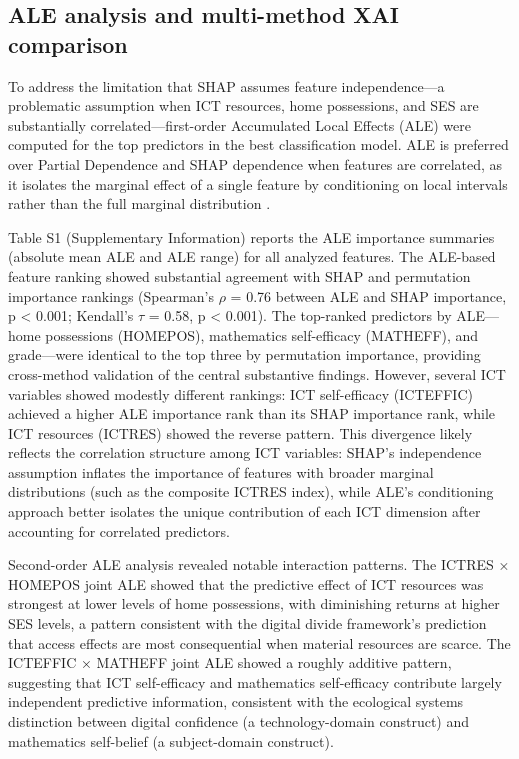 \documentclass[pdflatex,sn-mathphys-ay]{sn-jnl}
\begin{document}
\subsection{ALE analysis and multi-method XAI comparison}

To address the limitation that SHAP assumes feature independence---a problematic assumption when ICT resources, home possessions, and SES are substantially correlated---first-order Accumulated Local Effects (ALE) were computed for the top predictors in the best classification model. ALE is preferred over Partial Dependence and SHAP dependence when features are correlated, as it isolates the marginal effect of a single feature by conditioning on local intervals rather than the full marginal distribution \citep{Molnar_2022,Herbinger_2024_GADGET}.

Table S1 (Supplementary Information) reports the ALE importance summaries (absolute mean ALE and ALE range) for all analyzed features. The ALE-based feature ranking showed substantial agreement with SHAP and permutation importance rankings (Spearman's $\rho$ = 0.76 between ALE and SHAP importance, p < 0.001; Kendall's $\tau$ = 0.58, p < 0.001). The top-ranked predictors by ALE---home possessions (HOMEPOS), mathematics self-efficacy (MATHEFF), and grade---were identical to the top three by permutation importance, providing cross-method validation of the central substantive findings. However, several ICT variables showed modestly different rankings: ICT self-efficacy (ICTEFFIC) achieved a higher ALE importance rank than its SHAP importance rank, while ICT resources (ICTRES) showed the reverse pattern. This divergence likely reflects the correlation structure among ICT variables: SHAP's independence assumption inflates the importance of features with broader marginal distributions (such as the composite ICTRES index), while ALE's conditioning approach better isolates the unique contribution of each ICT dimension after accounting for correlated predictors.

Second-order ALE analysis revealed notable interaction patterns. The ICTRES × HOMEPOS joint ALE showed that the predictive effect of ICT resources was strongest at lower levels of home possessions, with diminishing returns at higher SES levels, a pattern consistent with the digital divide framework's prediction that access effects are most consequential when material resources are scarce. The ICTEFFIC × MATHEFF joint ALE showed a roughly additive pattern, suggesting that ICT self-efficacy and mathematics self-efficacy contribute largely independent predictive information, consistent with the ecological systems distinction between digital confidence (a technology-domain construct) and mathematics self-belief (a subject-domain construct).
\end{document}
